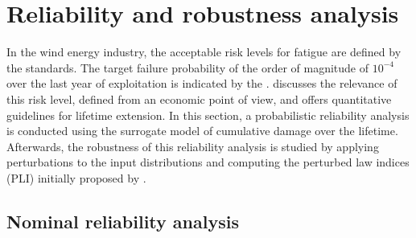 \section{Reliability and robustness analysis}
In the wind energy industry, the acceptable risk levels for fatigue are defined by the standards. 
The target failure probability of the order of magnitude of $10^{-4}$ over the last year of exploitation is indicated by the \citet{iec_2019}. 
\citet{nielsen_2021_risk_levels} discusses the relevance of this risk level, defined from an economic point of view, and offers quantitative guidelines for lifetime extension. 
In this section, a probabilistic reliability analysis is conducted using the surrogate model of cumulative damage over the lifetime. 
Afterwards, the robustness of this reliability analysis is studied by applying perturbations to the input distributions and computing the perturbed law indices (PLI) initially proposed by \citet{lemaitre_2015_PLI}. 


\subsection{Nominal reliability analysis}\label{sec:owt_ra}

